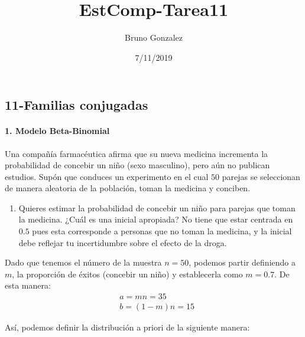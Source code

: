 \documentclass[]{article}
\title{EstComp-Tarea11}
\author{Bruno Gonzalez}
\date{7/11/2019}
\providecommand{\tightlist}{%
  \setlength{\itemsep}{0pt}\setlength{\parskip}{0pt}}
\let\oldparagraph\paragraph
\renewcommand{\paragraph}[1]{\oldparagraph{#1}\mbox{}}
\begin{document}
\maketitle

\hypertarget{familias-conjugadas}{%
\subsection{11-Familias conjugadas}\label{familias-conjugadas}}

\hypertarget{modelo-beta-binomial}{%
\paragraph{1. Modelo Beta-Binomial}\label{modelo-beta-binomial}}

Una compañía farmacéutica afirma que su nueva medicina incrementa la
probabilidad de concebir un niño (sexo masculino), pero aún no publican
estudios. Supón que conduces un experimento en el cual \(50\) parejas se
seleccionan de manera aleatoria de la población, toman la medicina y
conciben.

\begin{enumerate}
\def\labelenumi{\alph{enumi})}
\tightlist
\item
  Quieres estimar la probabilidad de concebir un niño para parejas que
  toman la medicina. ¿Cuál es una inicial apropiada? No tiene que estar
  centrada en \(0.5\) pues esta corresponde a personas que no toman la
  medicina, y la inicial debe reflejar tu incertidumbre sobre el efecto
  de la droga.
\end{enumerate}

Dado que tenemos el número de la muestra \(n = 50\), podemos partir
definiendo a \(m\), la proporción de éxitos (concebir un niño) y
establecerla como \(m = 0.7\). De esta manera: \[ \begin{align*}
&a = mn = 35 \\
&b = (1-m)n = 15
\end{align*}\]

Así, podemos definir la distribución a priori de la siguiente manera:
\end{document}
